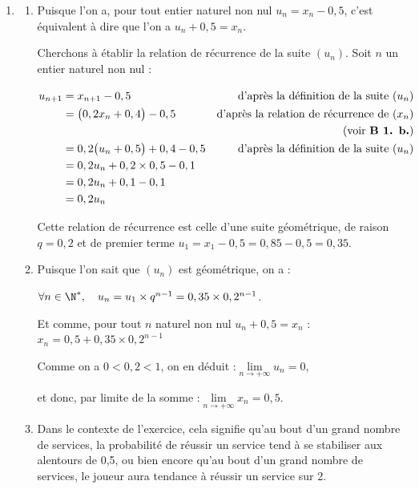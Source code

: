 \begin{enumerate}
\begin{enumerate}
$R_n$ et $\overline{R_n}$ partitionnant l'univers, d'après la loi des probabilités totales, on a :

$\aligned[t] x_{n+1} &= P(R_{n+1}) \\
&= P\big(R_{n+1} \cap R_n\big)P\big(R_{n+1} \cap \overline{R_n}\big)\\
&= x_n \times 0,6 + (1 - x_n)\times 0,4 \\
&= 0,6 x_n + 0,4 - 0,4x_n \\
&= 0,2x_n + 0,4.\endaligned$

On a bien établi la relation de récurrence attendue pour la suite $(x_n)$.
	\end{enumerate}

	\item \begin{enumerate}
		\item Puisque l'on a, pour tout entier naturel non nul $u_n = x_n - 0,5$, c'est équivalent à dire que l'on a $u_n + 0,5 = x_n$.

		Cherchons à établir la relation de récurrence de la suite $(u_n)$. Soit $n$ un entier naturel non nul :

$\aligned[t] u_{n+1} &= x_{n+1} - 0,5 &\text{d'après la définition de la suite }(u_n)\\
&=\big(0,2 x_n + 0,4\big) -0,5&\text{d'après la relation de récurrence de }(x_n) \\
&&\text{ (voir \textbf{B 1. b.})}\\
&=0,2 \big(u_n + 0,5\big) + 0,4 - 0,5&\text{d'après la définition de la suite }(u_n)\\
&=0,2u_n + 0,2\times 0,5 - 0,1\\
&=0,2u_n + 0,1 - 0,1\\
&=0,2u_n\\ \endaligned$

Cette relation de récurrence est celle d'une suite géométrique, de raison $q= 0,2$ et de premier terme $u_1 = x_1 - 0,5 = 0,85 - 0,5 = 0,35$.

	\item Puisque l'on sait que $(u_n)$ est géométrique, on a :

$\forall n \in \N^*,\quad u_n = u_1 \times q^{n-1} = 0,35 \times 0,2^{n-1}$.

Et comme, pour tout $n$ naturel non nul $u_n + 0,5 = x_n$ :\quad $x_n = 0,5 + 0,35 \times 0,2^{n-1}$

Comme on a $0 < 0,2 < 1$, on en déduit :\quad$\lim\limits_{n \to +\infty} u_n = 0$,

	et donc, par limite de la somme :\quad $\lim\limits_{n \to +\infty} x_n = 0,5$.


	\item Dans le contexte de l'exercice, cela signifie qu'au bout d'un grand nombre de services, la probabilité de réussir un service tend à se stabiliser aux alentours de 0,5, ou bien encore qu'au bout d'un grand nombre de services, le joueur aura tendance à réussir un service sur 2.
\end{enumerate}
\end{enumerate}

